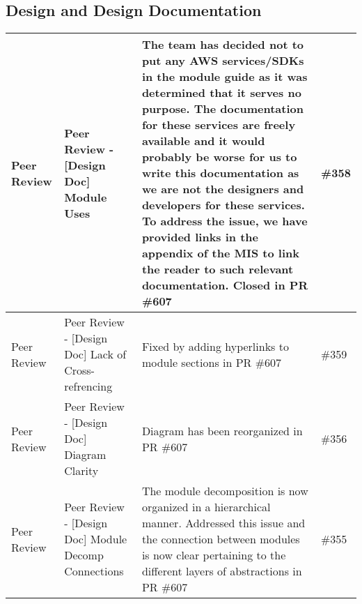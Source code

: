 \documentclass{article}
\begin{document}
\subsection{Design and Design Documentation}
\begin{longtable}{|m{3cm}|m{3cm}|m{5cm}|m{1cm}|}
\hline
 Peer Review & Peer Review - [Design Doc] Module Uses & The team has decided not to put any AWS services/SDKs in the module guide
 as it was determined that it serves no purpose. The documentation for these services are freely available and it would probably
 be worse for us to write this documentation as we are not the designers and developers for these services. 
 To address the issue, we have provided links in the appendix of the MIS to link the reader to such relevant documentation.
 Closed in PR \#607 & \#358\\
 \hline
 Peer Review & Peer Review - [Design Doc] Lack of Cross-refrencing & Fixed by adding hyperlinks to module sections in PR \#607 & \#359\\
 \hline
 Peer Review & Peer Review - [Design Doc] Diagram Clarity & Diagram has been reorganized in PR \#607 & \#356\\
 \hline
 Peer Review & Peer Review - [Design Doc] Module Decomp Connections & The module decomposition is now organized in a hierarchical manner. 
 Addressed this issue and the connection between modules is now clear pertaining to the different layers of abstractions in PR \#607 & \#355\\
 \hline
\end{longtable}
\end{document}
